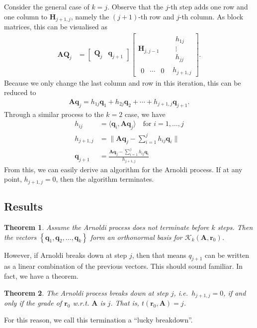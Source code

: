 \documentclass[12pt,a4paper]{article} %
\newtheorem*{theorem}{Theorem}
\begin{document}
Consider the general case of $k=j$. Observe that the $j$-th step adds 
one row and one column to $\mathbf H_{j+1,j}$, namely the $(j+1)$-th row and $j$-th 
column. As block matrices, this can be visualised as 
\begin{align*}
    \mathbf A \mathbf Q_j &= \begin{bmatrix}
        \mathbf Q_j & \bm q_{j+1}
    \end{bmatrix}
    \begin{bmatrix}
        \mathbf H_{j,j-1} & \begin{matrix}
            h_{1j} \\ \vdots \\ h_{jj}
        \end{matrix} \\ 
        \begin{matrix}
            0 & \cdots & 0
        \end{matrix} & h_{j+1,j}
    \end{bmatrix}.
\end{align*}
Because we only change the last column and row in this iteration, this can be reduced to 
\begin{align*}
    \mathbf A \bm q_j = h_{1j}\bm q_1 + h_{2j} \bm q_2 + \cdots + h_{j+1,j}\bm q_{j+1}.
\end{align*}
Through a similar process to the $k=2$ case, we have 
\begin{align*}
    h_{ij} &= \langle \bm q_i, \mathbf A\bm q_j \rangle \quad \text{for } i=1, \ldots, j \\ 
    h_{j+1,j} &= \| \mathbf A \bm q_j - \textstyle\sum_{i=1}^j h_{ij} \bm q_i \| \\ 
    \bm q_{j+1} &= \frac{\mathbf A \bm q_j - \sum_{i=1}^j h_{ij} \bm q_i }{h_{j+1,j}}
\end{align*}
From this, we can easily derive an algorithm for the Arnoldi process.
If at any point, $h_{j+1,j} = 0$, then the algorithm terminates. 

\subsection{Results}
\begin{theorem}
    Assume the Arnoldi process does not terminate before $k$ steps. Then the
vectors $\left\{\bm{q}_{1}, \bm{q}_{2}, \ldots, \bm{q}_{k}\right\}$ 
form an orthonormal basis for $\mathcal{K}_{k}\left(\mathbf{A}, \bm{r}_{0}\right)$.
\end{theorem}
However, if Arnoldi breaks down at step $j$, then that means $q_{j+1}$ can be written 
as a linear combination of the previous vectors. This should sound familiar. In fact,
we have a theorem.
\begin{theorem}
    The Arnoldi process breaks down at step $j$, i.e.\ $h_{j+1, j}=0$, if and only if the grade of $\bm{r}_{0}$
     w.r.t. $\mathbf{A}$ is $j$. That is, $t\left(\bm{r}_{0}, \bm{A}\right)=j$.
\end{theorem}
For this reason, we call this termination a ``lucky breakdown''.
\end{document}
